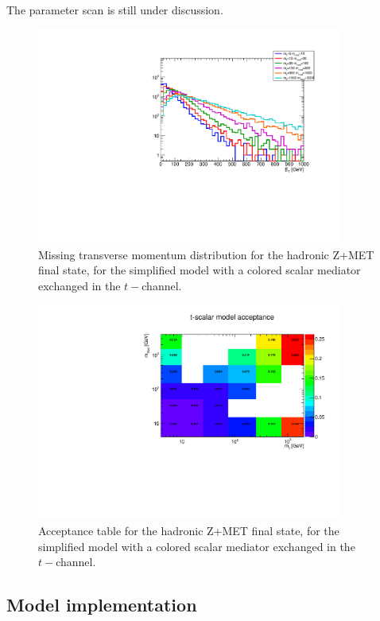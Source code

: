 The parameter scan is still under discussion. 

\begin{figure}[h!]
  \centering  
      \includegraphics[width=0.9\textwidth]{figures/EW/monoZhad_TChannel/metPt}
    \caption{Missing transverse momentum distribution for the hadronic Z+MET final state,
    for the simplified model with a colored scalar mediator exchanged in the $t-$channel.}
    \label{fig:TChan_EW_Zhad_MET}
\end{figure}

\begin{figure}[h!]
  \centering  
      \includegraphics[width=0.9\textwidth]{figures/EW/monoZhad_TChannel/acc}
    \caption{Acceptance table for the hadronic Z+MET final state,
    for the simplified model with a colored scalar mediator exchanged in the $t-$channel.}
    \label{fig:TChan_EW_Zhad_acc}
\end{figure}

\subsection{Model implementation}


